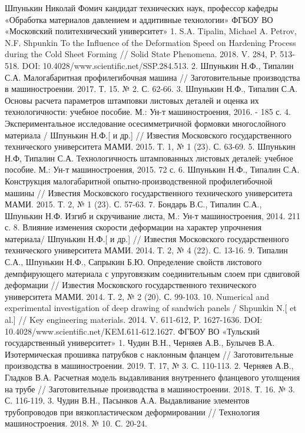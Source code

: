 Шпунькин Николай Фомич
кандидат технических наук, профессор кафедры «Обработка материалов давлением и аддитивные технологии» ФГБОУ ВО «Московский политехнический университет»
1. S.A. Tipalin, Michael A. Petrov, N.F. Shpunkin To the Influence of the Deformation Speed on Hardening Process during the Cold Sheet Forming // Solid State Phenomena. 2018. V. 284, P. 513-518. DOI: 10.4028/www.scientific.net/SSP.284.513.
2. Шпунькин Н.Ф., Типалин С.А. Малогабаритная профилегибочная машина // Заготовительные производства в машиностроении. 2017. Т. 15. № 2. С. 62-66.
3. Шпунькин Н.Ф., Типалин С.А. Основы расчета параметров штамповки листовых деталей и оценка их технологичности: учебное пособие. М.: Ун-т машиностроения, 2016. - 185 с.
4. Экспериментальное исследование осесимметричной формовки многослойного материала / Шпунькин Н.Ф.[ и др.] // Известия Московского государственного технического университета МАМИ. 2015. Т. 1, № 1 (23). С. 63-69. 
5. Шпунькин Н.Ф, Типалин С.А. Технологичность штампованных листовых деталей: учебное пособие. М.: Ун-т машиностроения, 2015. 72 с.
6. Шпунькин Н.Ф., Типалин С.А. Конструкция малогабаритной опытно-производственной профилегибочной машины // Известия Московского государственного технического университета МАМИ. 2015. Т. 2, № 1 (23). С. 57-63.
7. Бондарь В.С., Типалин С.А., Шпунькин Н.Ф. Изгиб и скручивание листа, М.: Ун-т машиностроения, 2014. 211 с.
8. Влияние изменения скорости деформации на характер упрочнения материала/ Шпунькин Н.Ф.[ и др.] // Известия Московского государственного технического университета МАМИ. 2014. Т. 2, № 4 (22). С. 13-16.
9. Типалин С.А., Шпунькин Н.Ф., Сапрыкин Б.Ю. Определение свойств листового демпфирующего материала с упруговязким соединительным слоем при сдвиговой деформации // Известия Московского государственного технического университета МАМИ. 2014. Т. 2, № 2 (20). С. 99-103.
10. Numerical and experimental investigation of deep drawing of sandwich panels / Shpunkin N.[ et al.] // Key engineering materials. 2014. V. 611-612, P. 1627-1636. 
DOI: 10.4028/www.scientific.net/KEM.611-612.1627.	
ФГБОУ ВО «Тульский государственный университет»
1. Чудин В.Н., Черняев А.В., Булычев В.А. Изотермическая прошивка патрубков с наклонным фланцем // Заготовительные производства в машиностроении. 2019. Т. 17, № 3. С. 110-113.
2. Черняев А.В., Гладков В.А. Расчетная модель выдавливания внутреннего фланцевого утолщения на трубе // Заготовительные производства в машиностроении. 2018. Т. 16. № 3. С. 116-119.
3. Чудин В.Н., Пасынков А.А. Выдавливание элементов трубопроводов при вязкопластическом деформировании // Технология машиностроения. 2018. № 10. С. 20-24.
